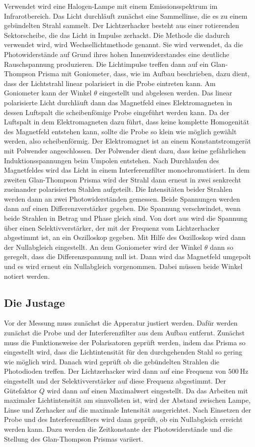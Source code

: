 Verwendet wird eine Halogen-Lampe mit einem Emissionsspektrum im Infrarotbereich.
Das Licht durchläuft zunächst eine Sammellinse, die es zu einem gebündelten
Strahl sammelt. Der Lichtzerhacker besteht aus einer rotierenden Sektorscheibe,
die das Licht in Impulse zerhackt. Die Methode die dadurch verwendet wird, wird
Wechsellichtmethode genannt. Sie wird verwendet, da die Photowiderstände auf
Grund ihres hohen Innenwiderstandes eine deutliche Rauschspannung produzieren.
Die Lichtimpulse treffen dann auf ein Glan-Thompson Prisma mit Goniometer, dass,
wie im Aufbau beschrieben, dazu dient, dass der Lichtstrahl linear polarisiert
in die Probe eintreten kann. Am Goniometer kann der Winkel $\theta$ eingestellt
und abgelesen werden. Das linear polarisierte Licht durchläuft dann das
Magnetfeld eines Elektromagneten in dessen Luftspalt die scheibenfömige
Probe eingeführt werden kann. Da der Luftspalt in dem Elektromagneten dazu führt,
dass keine komplette Homogenität des Magnetfeld entstehen kann, sollte die
Probe so klein wie möglich gewählt werden, also scheibenförmig. Der Elektromagnet
ist an einem Konstantstromgerät mit Polwender angeschlossen. Der Polwender dient
dazu, dass keine gefährlichen Induktionsspannungen beim Umpolen entstehen.
Nach Durchlaufen des Magnetfeldes wird das Licht in einem Interferenzfilter
monochromatisiert. In dem zweiten Glan-Thompson Prisma wird der Strahl dann
erneut in zwei senkrecht zueinander polarisierten Stahlen aufgeteilt. Die
Intensitäten beider Strahlen werden dann an zwei Photowiderständen gemessen.
Beide Spannungen werden dann auf einen Differenzverstärker gegeben. Die Spannung
verschwindet, wenn beide Strahlen in Betrag und Phase gleich sind. Von dort aus
wird die Spannung über einen Selektivverstärker, der mit der Frequenz vom
Lichtzerhacker abgestimmt ist, an ein Oszilloskop gegeben. Mit Hilfe des
Oszilloskop wird dann der Nullabgleich eingestellt. An dem Goniometer wird der
Winkel $\theta$ dann so geregelt, dass die Differenzspannung null ist. Dann wird
das Magnetfeld umgepolt und es wird erneut ein Nullabgleich vorgenommen. Dabei
müssen beide Winkel notiert werden.

\subsection{Die Justage}
Vor der Messung muss zunächst die Apperatur justiert werden. Dafür werden
zunächst die Probe und der Interferenzfilter aus dem Aufbau entfernt. Zunächst
muss die Funktionsweise der Polarisatoren geprüft werden, indem das Prisma so
eingestellt wird, dass die Lichtintensität für den durchgehenden Stahl
so gering wie möglich wird. Danach wird geprüft ob die gebündelten Strahlen
die Photodioden treffen. Der Lichtzerhacker wird dann auf eine Frequenz von
$\SI{500}{\hertz}$ eingestellt und der Selektivverstärker auf diese Frequenz
abgestimmt. Der Gütefaktor $Q$ wird dann auf einen Maximalwert eingestellt.
Da das Arbeiten mit maximaler Lichtintensität am sinnvollsten ist, wird der
Abstand zwischen Lampe, Linse und Zerhacker auf die maximale Intensität
ausgerichtet. Nach Einsetzen der Probe und des Interferenzfilters wird dann
geprüft, ob ein Nullabgleich erreicht werden kann. Dazu werden die Zeitkonstante
der Photowiderstände und die Stellung des Glan-Thompson Prismas variiert.

